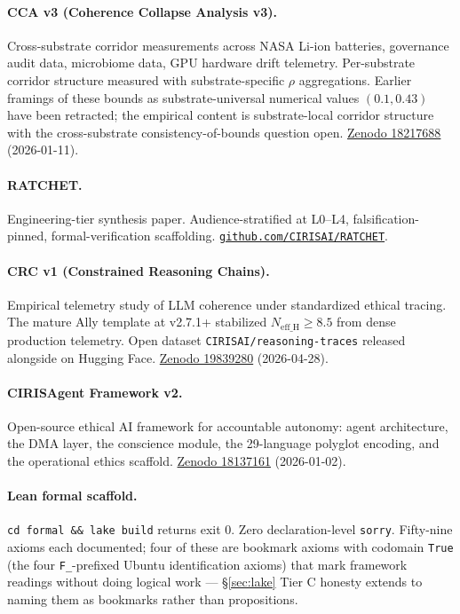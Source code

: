 \documentclass[11pt,a4paper]{article}
\begin{document}
\paragraph{CCA v3 (Coherence Collapse Analysis v3).} Cross-substrate corridor measurements across NASA Li-ion batteries, governance audit data, microbiome data, GPU hardware drift telemetry. Per-substrate corridor structure measured with substrate-specific $\rho$ aggregations. Earlier framings of these bounds as substrate-universal numerical values $(0.1, 0.43)$ have been retracted; the empirical content is substrate-local corridor structure with the cross-substrate consistency-of-bounds question open. \href{https://zenodo.org/records/18217688}{Zenodo 18217688} (2026-01-11).

\paragraph{RATCHET.} Engineering-tier synthesis paper. Audience-stratified at L0--L4, falsification-pinned, formal-verification scaffolding. \href{https://github.com/CIRISAI/RATCHET}{\texttt{github.com/CIRISAI/RATCHET}}.

\paragraph{CRC v1 (Constrained Reasoning Chains).} Empirical telemetry study of LLM coherence under standardized ethical tracing. The mature Ally template at v2.7.1+ stabilized $N_{\text{eff\_H}} \ge 8.5$ from dense production telemetry. Open dataset \texttt{CIRISAI/reasoning-traces} released alongside on Hugging Face. \href{https://zenodo.org/records/19839280}{Zenodo 19839280} (2026-04-28).

\paragraph{CIRISAgent Framework v2.} Open-source ethical AI framework for accountable autonomy: agent architecture, the DMA layer, the conscience module, the 29-language polyglot encoding, and the operational ethics scaffold. \href{https://zenodo.org/records/18137161}{Zenodo 18137161} (2026-01-02).

\paragraph{Lean formal scaffold.} \texttt{cd formal \&\& lake build} returns exit 0. Zero declaration-level \texttt{sorry}. Fifty-nine axioms each documented; four of these are bookmark axioms with codomain \texttt{True} (the four \texttt{F\_}-prefixed Ubuntu identification axioms) that mark framework readings without doing logical work --- \S\ref{sec:lake} Tier C honesty extends to naming them as bookmarks rather than propositions.
\end{document}

